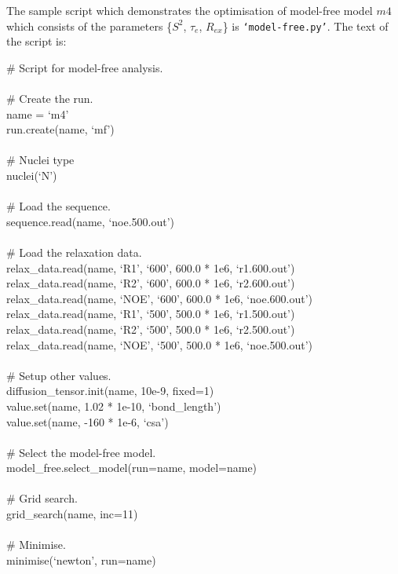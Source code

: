 The sample script which demonstrates the optimisation of model-free model $m4$ which consists of the parameters \{$S^2$, $\tau_e$, $R_{ex}$\} is \texttt{`model-free.py'}.  The text of the script is:

\begin{exampleenv}
\# Script for model-free analysis. \\
 \\
\# Create the run. \\
name = `m4' \\
run.create(name, `mf') \\
 \\
\# Nuclei type \\
nuclei(`N') \\
 \\
\# Load the sequence. \\
sequence.read(name, `noe.500.out') \\
 \\
\# Load the relaxation data. \\
relax\_data.read(name, `R1', `600', 600.0 * 1e6, `r1.600.out') \\
relax\_data.read(name, `R2', `600', 600.0 * 1e6, `r2.600.out') \\
relax\_data.read(name, `NOE', `600', 600.0 * 1e6, `noe.600.out') \\
relax\_data.read(name, `R1', `500', 500.0 * 1e6, `r1.500.out') \\
relax\_data.read(name, `R2', `500', 500.0 * 1e6, `r2.500.out') \\
relax\_data.read(name, `NOE', `500', 500.0 * 1e6, `noe.500.out') \\
 \\
\# Setup other values. \\
diffusion\_tensor.init(name, 10e-9, fixed=1) \\
value.set(name, 1.02 * 1e-10, `bond\_length') \\
value.set(name, -160 * 1e-6, `csa') \\
 \\
\# Select the model-free model. \\
model\_free.select\_model(run=name, model=name) \\
 \\
\# Grid search. \\
grid\_search(name, inc=11) \\
 \\
\# Minimise. \\
minimise(`newton', run=name) \\

\end{exampleenv}
